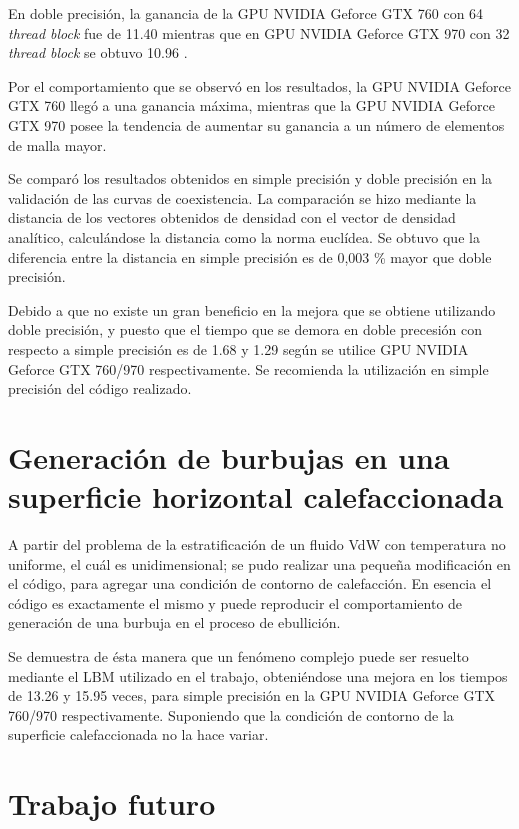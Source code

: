 En doble precisión, la ganancia de la GPU NVIDIA Geforce GTX 760 con 64 \textit{thread block} fue de 11.40 mientras que en GPU NVIDIA Geforce GTX 970 con 32 \textit{thread block} se obtuvo 10.96 .

Por el comportamiento que se observó en los resultados, la GPU NVIDIA Geforce GTX 760 llegó a una ganancia máxima, mientras que la GPU NVIDIA Geforce GTX 970 posee la tendencia de aumentar su ganancia a un número de elementos de malla mayor.

Se comparó los resultados obtenidos en simple precisión y doble precisión en la validación de las curvas de coexistencia. La comparación se hizo mediante la distancia de los vectores obtenidos de densidad con el vector de densidad analítico, calculándose la distancia como la norma euclídea. Se obtuvo que la diferencia entre la distancia en simple precisión es de 0,003 \% mayor que doble precisión.

Debido a que no existe un gran beneficio en la mejora que se obtiene utilizando doble precisión, y puesto que el tiempo que se demora en doble precesión con respecto a simple precisión es de 1.68 y 1.29 según se utilice GPU NVIDIA Geforce GTX 760/970 respectivamente. Se recomienda la utilización en simple precisión del código realizado.


\section{Generación de burbujas en una superficie horizontal calefaccionada}

A partir del problema de la estratificación de un fluido VdW con temperatura no uniforme, el cuál es unidimensional; se pudo realizar una pequeña modificación en el código, para agregar una condición de contorno de calefacción. En esencia el código es exactamente el mismo y puede reproducir el comportamiento de generación de una burbuja en el proceso de ebullición. 

Se demuestra de ésta manera que un fenómeno complejo puede ser resuelto mediante el LBM utilizado en el trabajo, obteniéndose una mejora en los tiempos de 13.26 y 15.95 veces, para simple precisión en la GPU NVIDIA Geforce GTX 760/970 respectivamente. Suponiendo que la condición de contorno de la superficie calefaccionada no la hace variar.

\section{Trabajo futuro}


